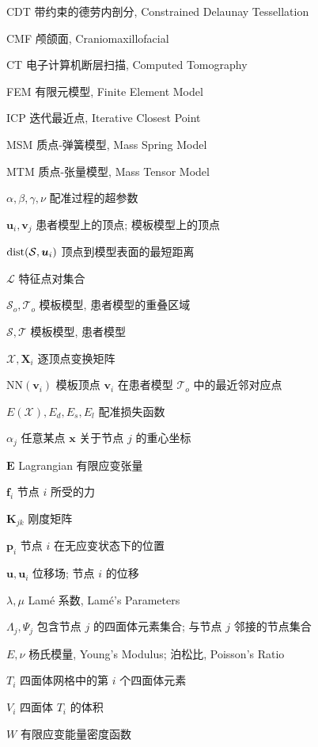 
\begin{denotation}[3cm]
  \item[CDT] 带约束的德劳内剖分, Constrained Delaunay Tessellation
  \item[CMF] 颅颌面, Craniomaxillofacial
  \item[CT] 电子计算机断层扫描, Computed Tomography
  \item[FEM] 有限元模型, Finite Element Model
  \item[ICP] 迭代最近点, Iterative Closest Point
  \item[MSM] 质点-弹簧模型, Mass Spring Model
  \item[MTM] 质点-张量模型, Mass Tensor Model

  \item[$\alpha, \beta, \gamma, \nu$] 配准过程的超参数
  \item[$\bm{u}_i, \bm{v}_j$] 患者模型上的顶点; 模板模型上的顶点
  \item[$\operatorname{dist}(\mathcal{S}, \bm{u}_i)$] 顶点到模型表面的最短距离
  \item[$\mathcal{L}$] 特征点对集合
  \item[$\mathcal{S}_o, \mathcal{T}_o$] 模板模型, 患者模型的重叠区域
  \item[$\mathcal{S}, \mathcal{T}$] 模板模型, 患者模型
  \item[$\mathcal{X}, \bm{X}_i$] 逐顶点变换矩阵
  \item[$\mathrm{NN}(\bm{v}_i)$] 模板顶点 $\bm{v}_i$ 在患者模型 $\mathcal{T}_o$ 中的最近邻对应点
  \item[$E(\mathcal{X}), E_d, E_s, E_l$] 配准损失函数

  \item[$\alpha_j$] 任意某点 $\bm{x}$ 关于节点 $j$ 的重心坐标
  \item[$\bm{E}$] Lagrangian 有限应变张量
  \item[$\bm{f}_i$] 节点 $i$ 所受的力
  \item[$\bm{K}_{jk}$] 刚度矩阵
  \item[$\bm{p}_i$] 节点 $i$ 在无应变状态下的位置
  \item[$\bm{u}, \bm{u}_i$] 位移场; 节点 $i$ 的位移
  \item[$\lambda, \mu$] Lam\'e 系数, Lam\'e's Parameters
  \item[$\Lambda_j, \Psi_j$] 包含节点 $j$ 的四面体元素集合; 与节点 $j$ 邻接的节点集合
  \item[$E, \nu$] 杨氏模量, Young's Modulus; 泊松比, Poisson's Ratio
  \item[$T_i$] 四面体网格中的第 $i$ 个四面体元素
  \item[$V_i$] 四面体 $T_i$ 的体积
  \item[$W$] 有限应变能量密度函数
\end{denotation}
